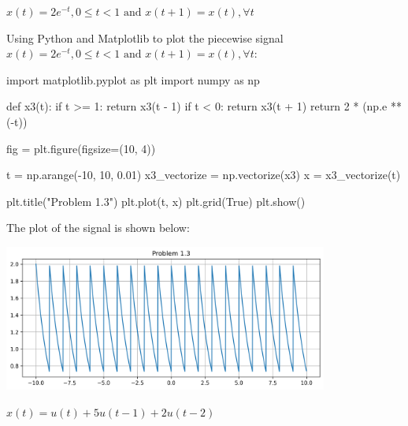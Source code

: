 \documentclass[a4paper, 10pt]{article}
\begin{document}
\begin{tosubmit}
\begin{subproblems}[start=3]
    \item \( x(t) = 2e^{-t}, 0 \leq t < 1 \text{ and } x(t + 1) = x(t), \forall t \)
\end{subproblems}

\par\noindent\submitsolution
Using Python and Matplotlib to plot the piecewise signal \( x(t) = 2e^{-t}, 0 \leq t < 1 \text{ and } x(t + 1) = x(t), \forall t \):
\begin{codingbox}
import matplotlib.pyplot as plt
import numpy as np

def x3(t):
    if t >= 1:
        return x3(t - 1)
    if t < 0:
        return x3(t + 1)
    return 2 * (np.e ** (-t))

fig = plt.figure(figsize=(10, 4))

t = np.arange(-10, 10, 0.01)
x3_vectorize = np.vectorize(x3)
x = x3_vectorize(t)

plt.title("Problem 1.3")
plt.plot(t, x)
plt.grid(True)
plt.show()
\end{codingbox}

The plot of the signal is shown below:
\begin{center}
    \includegraphics[width=0.8\textwidth]{images/problem_1_3.png}
\end{center}
\end{tosubmit}

\newpage

\begin{subproblems}[start=4]
    \item \( x(t) = u(t) + 5u(t - 1) + 2u(t - 2) \)
\end{subproblems}
\end{document}
